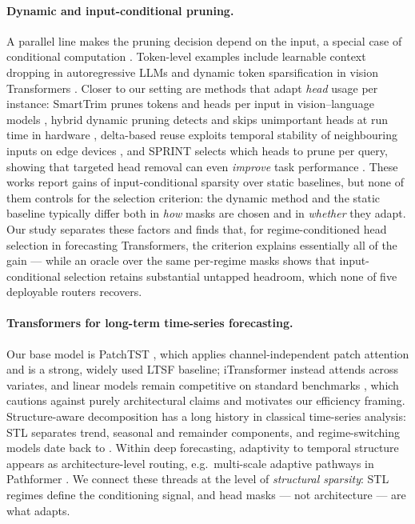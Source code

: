 \paragraph{Dynamic and input-conditional pruning.}
A parallel line makes the pruning decision depend on the input, a special
case of conditional computation \citep{han2021dynamic}. Token-level examples
include learnable context dropping in autoregressive LLMs
\citep{anagnostidis2023dynamic} and dynamic token sparsification in vision
Transformers \citep{rao2021dynamicvit}. Closer to our setting are methods
that adapt \emph{head} usage per instance: SmartTrim prunes tokens and heads
per input in vision--language models \citep{wang2024smarttrim}, hybrid
dynamic pruning detects and skips unimportant heads at run time in
hardware \citep{jaradat2024hybrid}, delta-based reuse exploits temporal
stability of neighbouring inputs on edge devices
\citep{jelcicova2022delta}, and SPRINT selects which heads to prune
per query, showing that targeted head removal can even \emph{improve}
task performance \citep{nguyen2025structured}. These works report gains of
input-conditional sparsity over static baselines, but none of them controls
for the selection criterion: the dynamic method and the static baseline
typically differ both in \emph{how} masks are chosen and in \emph{whether}
they adapt. Our study separates these factors and finds that, for
regime-conditioned head selection in forecasting Transformers, the criterion
explains essentially all of the gain --- while an oracle over the same
per-regime masks shows that input-conditional selection retains substantial
untapped headroom, which none of five deployable routers recovers.

\paragraph{Transformers for long-term time-series forecasting.}
Our base model is PatchTST \citep{nie2023patchtst}, which applies
channel-independent patch attention and is a strong, widely used LTSF
baseline; iTransformer \citep{liu2024itransformer} instead attends across
variates, and linear models remain competitive on standard benchmarks
\citep{zeng2023dlinear}, which cautions against purely architectural claims
and motivates our efficiency framing. Structure-aware decomposition has a
long history in classical time-series analysis: STL \citep{cleveland1990stl}
separates trend, seasonal and remainder components, and regime-switching
models date back to \citet{hamilton1989regime}. Within deep forecasting,
adaptivity to temporal structure appears as architecture-level routing,
e.g.\ multi-scale adaptive pathways in Pathformer \citep{chen2024pathformer}.
We connect these threads at the level of \emph{structural sparsity}: STL
regimes define the conditioning signal, and head masks --- not architecture
--- are what adapts.

